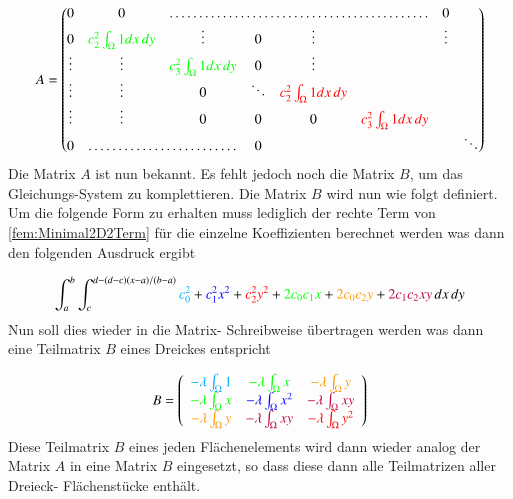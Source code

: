 \begin{equation}
 A = \begin{pmatrix} 0 & 0 & \hdotsfor{4} & 0 \\
	0 & \textcolor{green}{ c_2^2 \int_{\Omega} 1 dx \, dy }& \vdots & 0 & \vdots & & \vdots \\
	\vdots & \vdots & \textcolor{green}{c_3^2 \int_{\Omega} 1 dx \, dy }& 0 & \vdots  & & \\
	\vdots & \vdots & 0 & \ddots & \textcolor{red}{ c_2^2 \int_{\Omega} 1 dx \, dy }& & \\
	\vdots & \vdots & 0 & 0 & 0 & \textcolor{red}{c_3^2 \int_{\Omega} 1 dx \, dy} & \\
	0 & \hdotsfor{2} & 0 &  & & &  \ddots  \\
	\end{pmatrix}
	\label{fem:MatrixA}
\end{equation}
Die Matrix $A$ ist nun bekannt. Es fehlt jedoch noch die Matrix $B$, um das Gleichungs-System zu komplettieren. Die Matrix $B$ wird nun wie folgt definiert. Um die folgende Form zu erhalten muss lediglich der rechte Term von \ref{fem:Minimal2D2Term} für die einzelne Koeffizienten berechnet werden was dann den folgenden Ausdruck ergibt

\begin{equation}
			\int_a^b \int_c^{d-(d-c)(x-a)/(b-a)} \textcolor{cyan}{c_0^2} + \textcolor{blue}{c_1^2 x^2} + \textcolor{red}{c_2^2 y^2} + \textcolor{green}{2 c_0 c_1 x} + \textcolor{orange}{2 c_0 c_2 y} +\textcolor{purple}{ 2 c_1 c_2 xy} \, dx \, dy
			\label{fem:Minimal2LinAlgB}
\end{equation}
Nun soll dies wieder in die Matrix- Schreibweise übertragen werden was dann eine Teilmatrix $B$ eines Dreickes entspricht

\begin{equation}
 B = \left( \begin{array}{ccc}
	\textcolor{cyan}{- \lambda \int_{\Omega} 1} &  \textcolor{green}{- \lambda \int_{\Omega} x} & \textcolor{orange}{- \lambda \int_{\Omega} y}  \\
	\textcolor{green}{- \lambda \int_{\Omega}x} & \textcolor{blue}{- \lambda \int_{\Omega} x^2} &  \textcolor{purple}{- \lambda \int_{\Omega} xy} \\
	\textcolor{orange}{- \lambda \int_{\Omega} y} & \textcolor{purple}{- \lambda \int_{\Omega} xy} & \textcolor{red}{ - \lambda \int_{\Omega} y^2} \\
	\end{array}\right)
	\label{fem:MatrixB}
\end{equation}
Diese Teilmatrix $B$ eines jeden Flächenelements wird dann wieder analog der Matrix $A$ in eine Matrix $B$ eingesetzt, so dass diese dann alle Teilmatrizen aller Dreieck-  Flächenstücke enthält.


